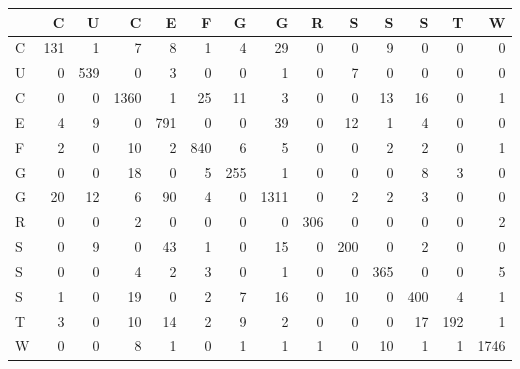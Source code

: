 \begin{tabular}{lrrrrrrrrrrrrr}
\toprule
{} &    C &    U &     C &    E &    F &    G &     G &    R &    S &    S &    S &    T &     W \\
\midrule
C &  131 &    1 &     7 &    8 &    1 &    4 &    29 &    0 &    0 &    9 &    0 &    0 &     0 \\
U &    0 &  539 &     0 &    3 &    0 &    0 &     1 &    0 &    7 &    0 &    0 &    0 &     0 \\
C &    0 &    0 &  1360 &    1 &   25 &   11 &     3 &    0 &    0 &   13 &   16 &    0 &     1 \\
E &    4 &    9 &     0 &  791 &    0 &    0 &    39 &    0 &   12 &    1 &    4 &    0 &     0 \\
F &    2 &    0 &    10 &    2 &  840 &    6 &     5 &    0 &    0 &    2 &    2 &    0 &     1 \\
G &    0 &    0 &    18 &    0 &    5 &  255 &     1 &    0 &    0 &    0 &    8 &    3 &     0 \\
G &   20 &   12 &     6 &   90 &    4 &    0 &  1311 &    0 &    2 &    2 &    3 &    0 &     0 \\
R &    0 &    0 &     2 &    0 &    0 &    0 &     0 &  306 &    0 &    0 &    0 &    0 &     2 \\
S &    0 &    9 &     0 &   43 &    1 &    0 &    15 &    0 &  200 &    0 &    2 &    0 &     0 \\
S &    0 &    0 &     4 &    2 &    3 &    0 &     1 &    0 &    0 &  365 &    0 &    0 &     5 \\
S &    1 &    0 &    19 &    0 &    2 &    7 &    16 &    0 &   10 &    0 &  400 &    4 &     1 \\
T &    3 &    0 &    10 &   14 &    2 &    9 &     2 &    0 &    0 &    0 &   17 &  192 &     1 \\
W &    0 &    0 &     8 &    1 &    0 &    1 &     1 &    1 &    0 &   10 &    1 &    1 &  1746 \\
\bottomrule
\end{tabular}
